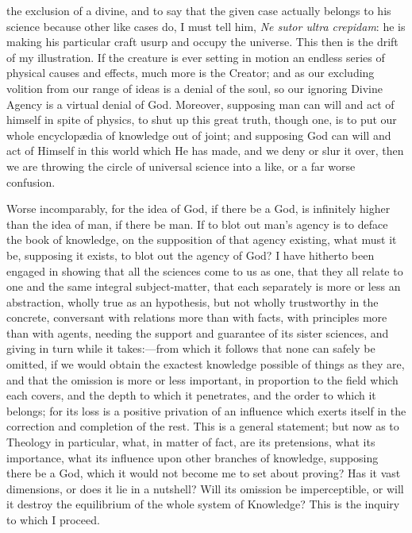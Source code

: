 the exclusion of a divine, and to say that the given case actually
belongs to his science because other like cases do, I must tell him, \emph{Ne
sutor ultra crepidam}: he is making his particular craft usurp and
occupy the universe. This then is the drift of my illustration. If the
creature is ever setting in motion an endless series of physical
causes and effects, much more is the Creator; and as our excluding
volition from our range of ideas is a denial of the soul, so our
ignoring Divine Agency is a virtual denial of God. Moreover, supposing
man can will and act of himself in spite of physics, to shut up this
great truth, though one, is to put our whole encyclopædia of
knowledge out of joint; and supposing God can will and act of Himself
in this world which He has made, and we deny or slur it over, then we
are throwing the circle of universal science into a like, or a far
worse confusion.

Worse incomparably, for the idea of God, if there be a God, is
infinitely higher than the idea of man, if there be man. If to blot
out man's agency is to deface the book of knowledge, on the
supposition of that agency existing, what must it be, supposing it
exists, to blot out the agency of God? I have hitherto been engaged in
showing that all the sciences come to us as one, that they all
relate to one and the same integral subject-matter, that each
separately is more or less an abstraction, wholly true as an
hypothesis, but not wholly trustworthy in the concrete, conversant
with relations more than with facts, with principles more than with
agents, needing the support and guarantee of its sister sciences, and
giving in turn while it takes:—from which it follows that none can
safely be omitted, if we would obtain the exactest knowledge possible
of things as they are, and that the omission is more or less
important, in proportion to the field which each covers, and the depth
to which it penetrates, and the order to which it belongs; for its
loss is a positive privation of an influence which exerts itself in
the correction and completion of the rest. This is a general
statement; but now as to Theology in particular, what, in matter of
fact, are its pretensions, what its importance, what its influence
upon other branches of knowledge, supposing there be a God, which it
would not become me to set about proving? Has it vast dimensions, or
does it lie in a nutshell? Will its omission be imperceptible, or will
it destroy the equilibrium of the whole system of Knowledge? This is
the inquiry to which I proceed.

